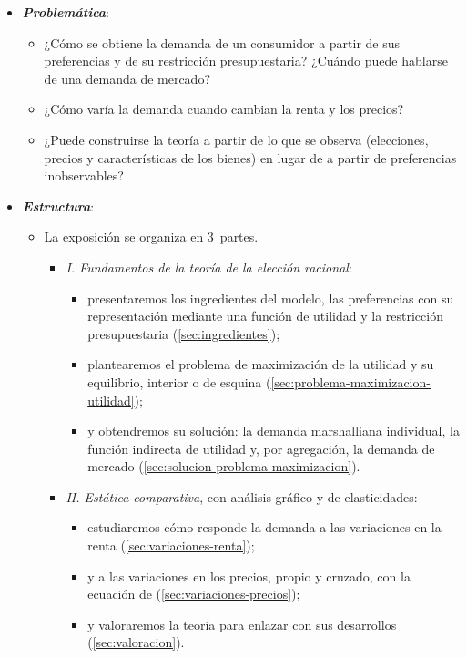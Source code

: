 \documentclass[11pt]{article}
\begin{document}
\begin{itemize}
\item \textbf{\emph{Problemática}}:
  \begin{itemize}
  \item ¿Cómo se obtiene la demanda de un consumidor a partir de sus preferencias y de su restricción presupuestaria? ¿Cuándo puede hablarse de una demanda de mercado?
  \item ¿Cómo varía la demanda cuando cambian la renta y los precios?
  \item ¿Puede construirse la teoría a partir de lo que se observa (elecciones, precios y características de los bienes) en lugar de a partir de preferencias inobservables?
  \end{itemize}

\item \textbf{\emph{Estructura}}:
  \begin{itemize}
  \item La exposición se organiza en 3~partes.
  \begin{itemize}
  \item \emph{I. Fundamentos de la teoría de la elección racional}:
    \begin{itemize}
    \item presentaremos los ingredientes del modelo, las preferencias con su representación mediante una función de utilidad y la restricción presupuestaria (\ref{sec:ingredientes});
    \item plantearemos el problema de maximización de la utilidad y su equilibrio, interior o de esquina (\ref{sec:problema-maximizacion-utilidad});
    \item y obtendremos su solución: la demanda marshalliana individual, la función indirecta de utilidad y, por agregación, la demanda de mercado (\ref{sec:solucion-problema-maximizacion}).
    \end{itemize}
  \item \emph{II. Estática comparativa}, con análisis gráfico y de elasticidades:
    \begin{itemize}
    \item estudiaremos cómo responde la demanda a las variaciones en la renta (\ref{sec:variaciones-renta});
    \item y a las variaciones en los precios, propio y cruzado, con la ecuación de  (\ref{sec:variaciones-precios});
    \item y valoraremos la teoría para enlazar con sus desarrollos (\ref{sec:valoracion}).
    \end{itemize}

\end{itemize}
\end{itemize}
\end{itemize}
\end{document}
